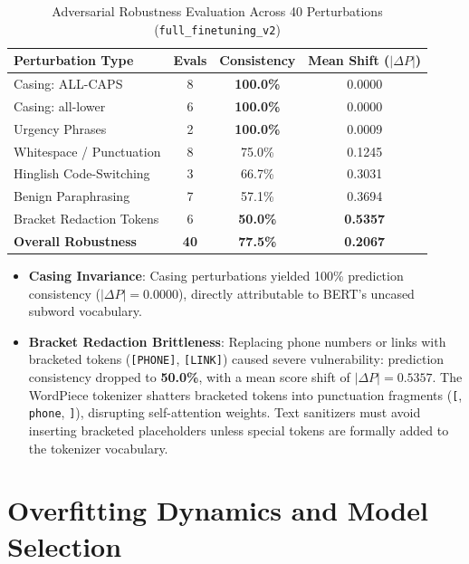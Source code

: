 \documentclass[conference]{IEEEtran}
\begin{document}
\begin{table}[t]
\caption{Adversarial Robustness Evaluation Across 40 Perturbations (\texttt{full\_finetuning\_v2})}
\label{tab:robustness_results}
\centering
\begin{tabularx}{\columnwidth}{Xccc}
\toprule
\textbf{Perturbation Type} & \textbf{Evals} & \textbf{Consistency} & \textbf{Mean Shift ($|\Delta P|$)} \\
\midrule
Casing: ALL-CAPS & 8 & \textbf{100.0\%} & 0.0000 \\
Casing: all-lower & 6 & \textbf{100.0\%} & 0.0000 \\
Urgency Phrases & 2 & \textbf{100.0\%} & 0.0009 \\
Whitespace / Punctuation & 8 & 75.0\% & 0.1245 \\
Hinglish Code-Switching & 3 & 66.7\% & 0.3031 \\
Benign Paraphrasing & 7 & 57.1\% & 0.3694 \\
Bracket Redaction Tokens & 6 & \textbf{50.0\%} & \textbf{0.5357} \\
\midrule
\textbf{Overall Robustness} & \textbf{40} & \textbf{77.5\%} & \textbf{0.2067} \\
\bottomrule
\end{tabularx}
\end{table}

\begin{itemize}
    \item \textbf{Casing Invariance}: Casing perturbations yielded 100\% prediction consistency ($|\Delta P| = 0.0000$), directly attributable to BERT's uncased subword vocabulary.
    \item \textbf{Bracket Redaction Brittleness}: Replacing phone numbers or links with bracketed tokens (\texttt{[PHONE]}, \texttt{[LINK]}) caused severe vulnerability: prediction consistency dropped to \textbf{50.0\%}, with a mean score shift of \textbf{$|\Delta P| = 0.5357$}. The WordPiece tokenizer shatters bracketed tokens into punctuation fragments (\texttt{[}, \texttt{phone}, \texttt{]}), disrupting self-attention weights. Text sanitizers must avoid inserting bracketed placeholders unless special tokens are formally added to the tokenizer vocabulary.
\end{itemize}

\section{Overfitting Dynamics and Model Selection}
\label{sec:overfitting_selection}
\end{document}
